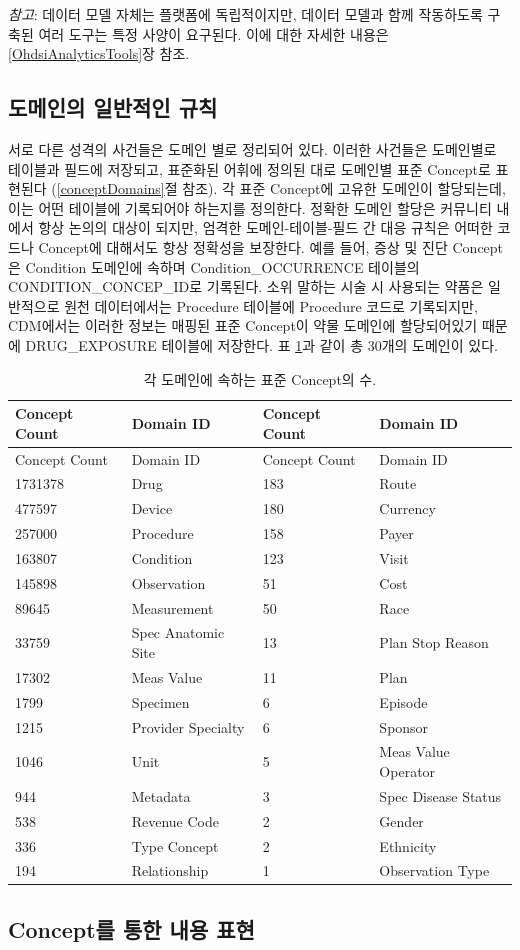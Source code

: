\documentclass[11pt]{book}
\theoremstyle{definition}
\theoremstyle{definition}
\theoremstyle{definition}
\theoremstyle{remark}
\begin{document}
\emph{참고}: 데이터 모델 자체는 플랫폼에 독립적이지만, 데이터 모델과
함께 작동하도록 구축된 여러 도구는 특정 사양이 요구된다. 이에 대한
자세한 내용은 \ref{OhdsiAnalyticsTools}장 참조.

\subsection{도메인의 일반적인 규칙}\label{domains}

서로 다른 성격의 사건들은 도메인 별로 정리되어 있다. 이러한 사건들은
도메인별로 테이블과 필드에 저장되고, 표준화된 어휘에 정의된 대로
도메인별 표준 Concept로 표현된다 (\ref{conceptDomains}절 참조). 각 표준
Concept에 고유한 도메인이 할당되는데, 이는 어떤 테이블에 기록되어야
하는지를 정의한다. 정확한 도메인 할당은 커뮤니티 내에서 항상 논의의
대상이 되지만, 엄격한 도메인-테이블-필드 간 대응 규칙은 어떠한 코드나
Concept에 대해서도 항상 정확성을 보장한다. 예를 들어, 증상 및 진단
Concept은 Condition 도메인에 속하며 Condition\_OCCURRENCE 테이블의
CONDITION\_CONCEP\_ID로 기록된다. 소위 말하는 시술 시 사용되는 약품은
일반적으로 원천 데이터에서는 Procedure 테이블에 Procedure 코드로
기록되지만, CDM에서는 이러한 정보는 매핑된 표준 Concept이 약물 도메인에
할당되어있기 때문에 DRUG\_EXPOSURE 테이블에 저장한다. 표
\ref{tab:domains}과 같이 총 30개의 도메인이 있다.

\begin{longtable}[]{@{}llll@{}}
\caption{\label{tab:domains} 각 도메인에 속하는 표준 Concept의
수.}\tabularnewline
\toprule
Concept Count & Domain ID & Concept Count & Domain ID\tabularnewline
\midrule
\endfirsthead
\toprule
Concept Count & Domain ID & Concept Count & Domain ID\tabularnewline
\midrule
\endhead
1731378 & Drug & 183 & Route\tabularnewline
477597 & Device & 180 & Currency\tabularnewline
257000 & Procedure & 158 & Payer\tabularnewline
163807 & Condition & 123 & Visit\tabularnewline
145898 & Observation & 51 & Cost\tabularnewline
89645 & Measurement & 50 & Race\tabularnewline
33759 & Spec Anatomic Site & 13 & Plan Stop Reason\tabularnewline
17302 & Meas Value & 11 & Plan\tabularnewline
1799 & Specimen & 6 & Episode\tabularnewline
1215 & Provider Specialty & 6 & Sponsor\tabularnewline
1046 & Unit & 5 & Meas Value Operator\tabularnewline
944 & Metadata & 3 & Spec Disease Status\tabularnewline
538 & Revenue Code & 2 & Gender\tabularnewline
336 & Type Concept & 2 & Ethnicity\tabularnewline
194 & Relationship & 1 & Observation Type\tabularnewline
\bottomrule
\end{longtable}

\subsection{Concept를 통한 내용 표현}\label{concept---}
\end{document}
